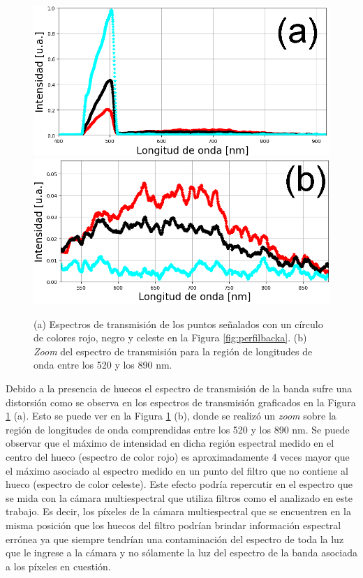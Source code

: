 \begin{figure}[H]
\hfill%
\includegraphics[scale=0.5]{Figs/microespectrometro/espectroshueco.png}
\hfill%
\includegraphics[scale=0.5]{Figs/microespectrometro/zoomdistorsionazul.png}
\hfill%
\hfill%
\caption{(a) Espectros de transmisión de los puntos señalados con un círculo de colores rojo, negro y celeste en la Figura \ref{fig:perfilbacka}. (b) \textit{Zoom} del espectro de transmisión para la región de longitudes de onda entre los 520 y los 890 nm.}
\label{fig:esto}
\end{figure}

Debido a la presencia de huecos el espectro de transmisión de la banda sufre una distorsión como se observa en los espectros de transmisión graficados en la Figura \ref{fig:esto} (a). Esto se puede ver en la Figura \ref{fig:esto} (b), donde se realizó un \textit{zoom} sobre la región de longitudes de onda comprendidas entre los 520 y los 890 nm. Se puede observar que el máximo de intensidad en dicha región espectral medido en el centro del hueco (espectro de color rojo) es aproximadamente 4 veces mayor que el máximo asociado al espectro medido en un punto del filtro que no contiene al hueco (espectro de color celeste). Este efecto podría repercutir en el espectro que se mida con la cámara multiespectral que utiliza filtros como el analizado en este trabajo. Es decir, los píxeles de la cámara multiespectral que se encuentren en la misma posición que los huecos del filtro podrían brindar información espectral errónea ya que siempre tendrían una contaminación del espectro de toda la luz que le ingrese a la cámara y no sólamente la luz del espectro de la banda asociada a los píxeles en cuestión. 

